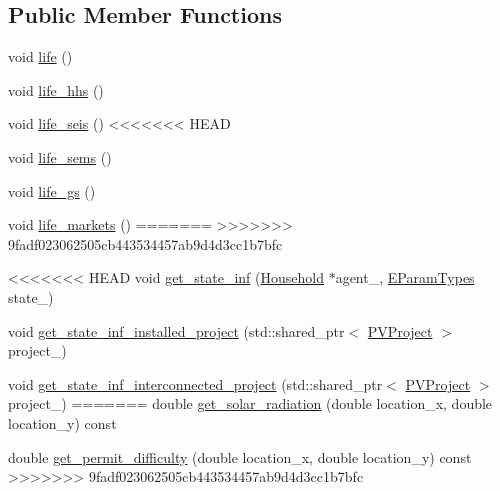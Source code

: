\subsection*{Public Member Functions}
{\bf }\par
\begin{DoxyCompactItemize}
\item 
void \hyperlink{classsolar__core_1_1_w_a5e64e5a7ef41c07fddf7994cd3f2693e}{life} ()
\item 
void \hyperlink{classsolar__core_1_1_w_a08283dbea7c7f3fe8b7f094a96f73a78}{life\+\_\+hhs} ()
\item 
void \hyperlink{classsolar__core_1_1_w_a77b206056c9440059f7b78e1424b0921}{life\+\_\+seis} ()
<<<<<<< HEAD
\item 
void \hyperlink{classsolar__core_1_1_w_a655c14c2a3d10952ab1217eedd21443f}{life\+\_\+sems} ()
\item 
void \hyperlink{classsolar__core_1_1_w_ad08af315706bb42ab5dd68f41a90c978}{life\+\_\+gs} ()
\item 
void \hyperlink{classsolar__core_1_1_w_a03a16fe70a11b947735709cf0a0b277e}{life\+\_\+markets} ()
=======
>>>>>>> 9fadf023062505cb443534457ab9d4d3cc1b7bfc
\end{DoxyCompactItemize}

{\bf }\par
\begin{DoxyCompactItemize}
\item 
<<<<<<< HEAD
void \hyperlink{classsolar__core_1_1_w_a7fd073f0ebbf06378919f677bc28c2d1}{get\+\_\+state\+\_\+inf} (\hyperlink{classsolar__core_1_1_household}{Household} $\ast$agent\+\_\+, \hyperlink{namespacesolar__core_aa1147341e5ef7a40d68d1bd68e149362}{E\+Param\+Types} state\+\_\+)
\item 
void \hyperlink{classsolar__core_1_1_w_a1d99a46827c504a542ecda81b201a8f5}{get\+\_\+state\+\_\+inf\+\_\+installed\+\_\+project} (std\+::shared\+\_\+ptr$<$ \hyperlink{classsolar__core_1_1_p_v_project}{P\+V\+Project} $>$ project\+\_\+)
\item 
void \hyperlink{classsolar__core_1_1_w_a04252bc7247e71aa41798e98e42b6c15}{get\+\_\+state\+\_\+inf\+\_\+interconnected\+\_\+project} (std\+::shared\+\_\+ptr$<$ \hyperlink{classsolar__core_1_1_p_v_project}{P\+V\+Project} $>$ project\+\_\+)
=======
double \hyperlink{classsolar__core_1_1_w_a39001b1adeb816c80cb63637801c4b9c}{get\+\_\+solar\+\_\+radiation} (double location\+\_\+x, double location\+\_\+y) const 
\item 
double \hyperlink{classsolar__core_1_1_w_a7906874c5180d8114e1acba095ace3f5}{get\+\_\+permit\+\_\+difficulty} (double location\+\_\+x, double location\+\_\+y) const 
>>>>>>> 9fadf023062505cb443534457ab9d4d3cc1b7bfc
\end{DoxyCompactItemize}

